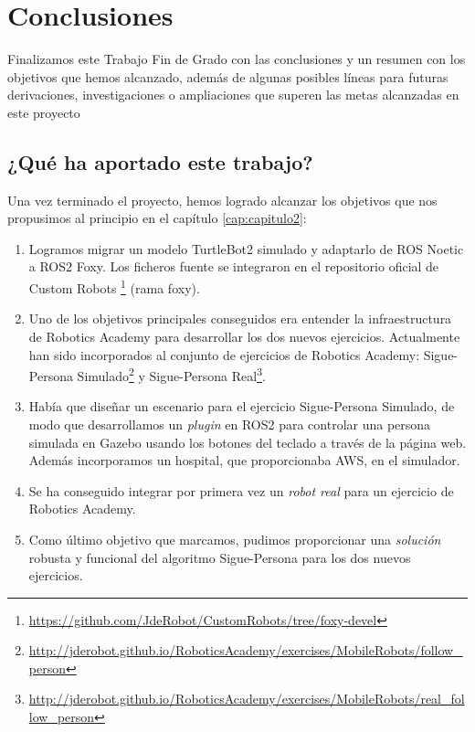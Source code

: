 \chapter{Conclusiones}
\label{cap:Conclusiones}

Finalizamos este Trabajo Fin de Grado con las conclusiones y un resumen con los objetivos que hemos alcanzado, además de algunas posibles líneas para futuras derivaciones, investigaciones o ampliaciones que superen las metas alcanzadas en este proyecto

\section{¿Qué ha aportado este trabajo?}
\label{sec:aportaciones}

Una vez terminado el proyecto, hemos logrado alcanzar los objetivos que nos propusimos al principio en el capítulo \ref{cap:capitulo2}:

\begin{enumerate}
	\item Logramos migrar un modelo TurtleBot2 simulado y adaptarlo de ROS Noetic a ROS2 Foxy. Los ficheros fuente se integraron en el repositorio oficial de Custom Robots \footnote{\url{https://github.com/JdeRobot/CustomRobots/tree/foxy-devel}} (rama foxy).
	\item Uno de los objetivos principales conseguidos era entender la infraestructura de Robotics Academy para desarrollar los dos nuevos ejercicios. Actualmente han sido incorporados al conjunto de ejercicios de Robotics Academy: Sigue-Persona Simulado\footnote{\url{http://jderobot.github.io/RoboticsAcademy/exercises/MobileRobots/follow_person}} y Sigue-Persona Real\footnote{\url{http://jderobot.github.io/RoboticsAcademy/exercises/MobileRobots/real_follow_person}}.
	\item Había que diseñar un escenario para el ejercicio Sigue-Persona Simulado, de modo que desarrollamos un \textit{plugin} en ROS2 para controlar una persona simulada en Gazebo usando los botones del teclado a través de la página web. Además incorporamos un hospital, que proporcionaba AWS, en el simulador.
	\item Se ha conseguido integrar por primera vez un \textit{robot real} para un ejercicio de Robotics Academy.
	\item Como último objetivo que marcamos, pudimos proporcionar una \textit{solución} robusta y funcional del algoritmo Sigue-Persona para los dos nuevos ejercicios.
\end{enumerate}

